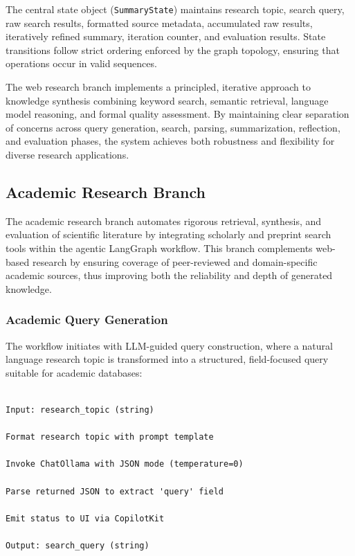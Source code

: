 The central state object (\texttt{SummaryState}) maintains research topic, search query, raw search results, formatted source metadata, accumulated raw results, iteratively refined summary, iteration counter, and evaluation results. State transitions follow strict ordering enforced by the graph topology, ensuring that operations occur in valid sequences.

The web research branch implements a principled, iterative approach to knowledge synthesis combining keyword search, semantic retrieval, language model reasoning, and formal quality assessment. By maintaining clear separation of concerns across query generation, search, parsing, summarization, reflection, and evaluation phases, the system achieves both robustness and flexibility for diverse research applications.

\subsection{Academic Research Branch}

The academic research branch automates rigorous retrieval, synthesis, and evaluation of scientific literature by integrating scholarly and preprint search tools within the agentic LangGraph workflow. This branch complements web-based research by ensuring coverage of peer-reviewed and domain-specific academic sources, thus improving both the reliability and depth of generated knowledge.

\subsubsection{Academic Query Generation}

The workflow initiates with LLM-guided query construction, where a natural language research topic is transformed into a structured, field-focused query suitable for academic databases:

\begin{lstlisting}

Input: research_topic (string)

Format research topic with prompt template 

Invoke ChatOllama with JSON mode (temperature=0)

Parse returned JSON to extract 'query' field

Emit status to UI via CopilotKit

Output: search_query (string)
\end{lstlisting}

